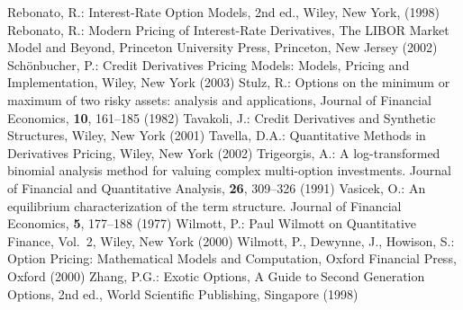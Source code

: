 \begin{thebibliography}{[KLR73]}
 Rebonato, R.: Interest-Rate Option Models, 2nd ed., Wiley, New York,  (1998)
 Rebonato, R.: Modern Pricing of Interest-Rate Derivatives,  The LIBOR Market Model and Beyond, Princeton University Press, Princeton, New Jersey (2002)
 Sch{\"o}nbucher, P.: Credit Derivatives Pricing Models:  Models, Pricing and Implementation, Wiley, New York (2003)
 Stulz, R.: Options on the minimum or maximum of two risky assets:  analysis and applications, Journal of Financial Economics, \textbf{10},  161--185 (1982)
 Tavakoli, J.: Credit Derivatives and Synthetic Structures, Wiley, New York (2001)
 Tavella, D.A.: Quantitative Methods in Derivatives Pricing, Wiley, New York (2002)
 Trigeorgis, A.: A log-transformed binomial analysis method for valuing complex multi-option investments. Journal of Financial and Quantitative Analysis, \textbf{26},  309--326 (1991)
 Vasicek, O.: An equilibrium characterization of the term structure. Journal of Financial Economics, \textbf{5},  177--188 (1977)
 Wilmott, P.: Paul Wilmott on Quantitative Finance, Vol.\ 2, Wiley, New York (2000)
 Wilmott, P., Dewynne, J., Howison, S.: Option Pricing:  Mathematical Models and Computation, Oxford Financial Press, Oxford (2000)
 Zhang, P.G.: Exotic Options,  A Guide to Second Generation Options, 2nd ed., World Scientific Publishing, Singapore (1998)
\end{thebibliography}